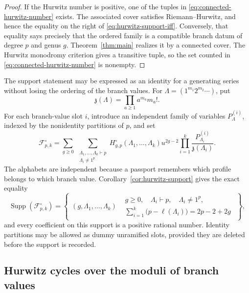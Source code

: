 \documentclass[11pt]{amsart}
\theoremstyle{plain}
\theoremstyle{definition}
\numberwithin{equation}{section}
\begin{document}
\begin{proof}
If the Hurwitz number is positive, one of the tuples in
\eqref{eq:connected-hurwitz-number} exists.  The associated cover satisfies
Riemann--Hurwitz, and hence the equality on the right of
\eqref{eq:hurwitz-support-iff}.  Conversely, that equality says precisely
that the ordered family is a compatible branch datum of degree $p$ and
genus $g$.  Theorem~\ref{thm:main} realizes it by a connected cover.  The
Hurwitz monodromy criterion gives a transitive tuple, so the set counted in
\eqref{eq:connected-hurwitz-number} is nonempty.
\end{proof}

The support statement may be expressed as an identity for a generating
series without losing the ordering of the branch values.  For
$\Lambda=(1^{m_1}2^{m_2}\cdots)$, put
\[
 \mathfrak z(\Lambda)=\prod_{a\geq1}a^{m_a}m_a!.
\]
For each branch-value slot $i$, introduce an independent family of
variables $P^{(i)}_\Lambda$, indexed by the nonidentity partitions of $p$,
and set
\begin{equation}\label{eq:prime-hurwitz-potential}
 \mathcal F^\circ_{p,k}
 =\sum_{g\geq0}\ \sum_{\substack{\Lambda_1,\ldots,\Lambda_k\vdash p\\
                                  \Lambda_i\neq1^p}}
 H^\circ_{g,p}(\Lambda_1,\ldots,\Lambda_k)
 u^{2g-2}\prod_{i=1}^k
 \frac{P^{(i)}_{\Lambda_i}}{\mathfrak z(\Lambda_i)}.
\end{equation}
The alphabets are independent because a passport remembers which profile
belongs to which branch value.  Corollary~\ref{cor:hurwitz-support} gives
the exact equality
\begin{equation}\label{eq:potential-support}
 \operatorname{Supp}(\mathcal F^\circ_{p,k})
 =\left\{\begin{array}{c|c}
  (g,\Lambda_1,\ldots,\Lambda_k)&
  \begin{array}{c}
   g\geq0,\quad \Lambda_i\vdash p,\quad \Lambda_i\neq1^p,\\
   \displaystyle\sum_{i=1}^k\bigl(p-\ell(\Lambda_i)\bigr)=2p-2+2g
  \end{array}
 \end{array}\right\},
\end{equation}
and every coefficient on this support is a positive rational number.
Identity partitions may be allowed as dummy unramified slots, provided
they are deleted before the support is recorded.

\subsection{Hurwitz cycles over the moduli of branch values}
\end{document}
